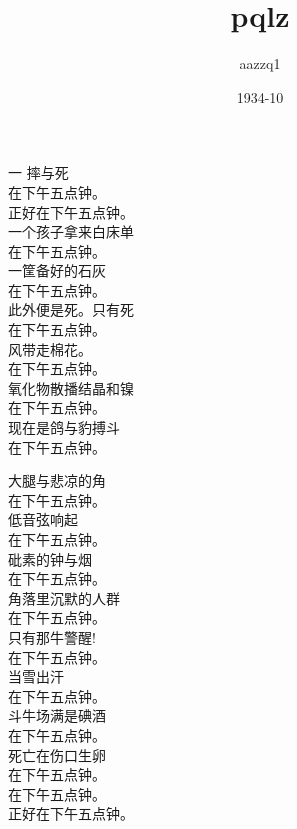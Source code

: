 \documentclass{article}
\title{pqlz}
\author{aazzq1}
\date{1934-10}
\begin{document}

\maketitle

\setlength\parindent{0pt}

\begin{center}

\begin{minipage}{0.5\linewidth}

\Large

﻿一 摔与死 \\

在下午五点钟。 \\
正好在下午五点钟。 \\
一个孩子拿来白床单 \\
在下午五点钟。 \\
一筐备好的石灰 \\
在下午五点钟。 \\
此外便是死。只有死 \\
在下午五点钟。 \\

风带走棉花。 \\
在下午五点钟。 \\
氧化物散播结晶和镍 \\
在下午五点钟。 \\
现在是鸽与豹搏斗 \\
在下午五点钟。 \\

\end{minipage}

\newpage

\begin{minipage}{0.5\linewidth}

\Large

大腿与悲凉的角 \\
在下午五点钟。 \\
低音弦响起 \\
在下午五点钟。 \\
砒素的钟与烟 \\
在下午五点钟。 \\
角落里沉默的人群 \\
在下午五点钟。 \\
只有那牛警醒! \\
在下午五点钟。 \\
当雪出汗 \\
在下午五点钟。 \\
斗牛场满是碘酒 \\
在下午五点钟。 \\
死亡在伤口生卵 \\
在下午五点钟。 \\
在下午五点钟。 \\
正好在下午五点钟。 \\


\end{minipage}
\end{center}
\end{document}
